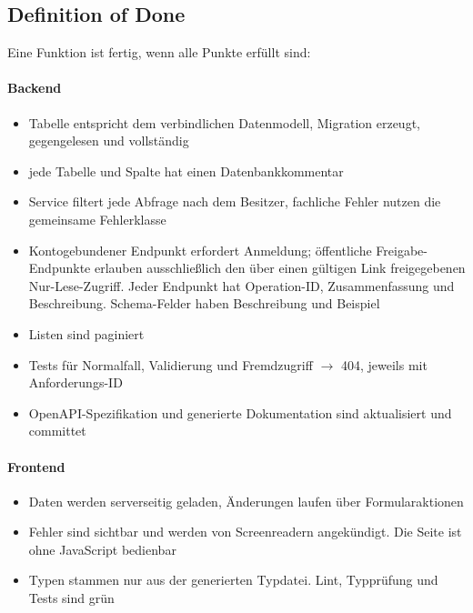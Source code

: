 \documentclass[11pt,a4paper]{article}
\begin{document}
\subsection{Definition of Done}

Eine Funktion ist fertig, wenn alle Punkte erfüllt sind:

\paragraph{Backend}

\begin{itemize}
\item[$\square$] Tabelle entspricht dem verbindlichen Datenmodell, Migration erzeugt, gegengelesen und vollständig
\item[$\square$] jede Tabelle und Spalte hat einen Datenbankkommentar
\item[$\square$] Service filtert jede Abfrage nach dem Besitzer, fachliche Fehler nutzen die gemeinsame Fehlerklasse
\item[$\square$] Kontogebundener Endpunkt erfordert Anmeldung; öffentliche Freigabe-Endpunkte erlauben ausschließlich den über einen gültigen Link freigegebenen Nur-Lese-Zugriff. Jeder Endpunkt hat Operation-ID, Zusammenfassung und Beschreibung. Schema-Felder haben Beschreibung und Beispiel
\item[$\square$] Listen sind paginiert
\item[$\square$] Tests für Normalfall, Validierung und Fremdzugriff $\rightarrow$ 404, jeweils mit Anforderungs-ID
\item[$\square$] OpenAPI-Spezifikation und generierte Dokumentation sind aktualisiert und committet
\end{itemize}


\paragraph{Frontend}

\begin{itemize}
\item[$\square$] Daten werden serverseitig geladen, Änderungen laufen über Formularaktionen
\item[$\square$] Fehler sind sichtbar und werden von Screenreadern angekündigt. Die Seite ist ohne JavaScript bedienbar
\item[$\square$] Typen stammen nur aus der generierten Typdatei. Lint, Typprüfung und Tests sind grün
\end{itemize}
\end{document}
